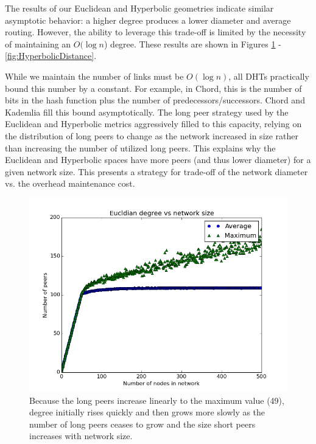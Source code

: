 The results of our Euclidean and Hyperbolic geometries indicate similar asymptotic behavior: a higher degree produces a lower diameter and average routing. 
However, the ability to leverage this trade-off is limited by the necessity of maintaining an $ O(\log n $) degree.
These results are shown in Figures \ref{fig:EucldianDegree} - \ref{fig:HyperbolicDistance}.

While we maintain the number of links must be $ O(\log n)$, all DHTs practically bound this number by a constant.  
For example, in Chord, this is the number of bits in the hash function plus the number of predecessors/successors.
Chord and Kademlia fill this bound asymptotically. 
The long peer strategy used by the Euclidean and Hyperbolic metrics aggressively filled to this capacity, relying on the distribution of long peers to change as the network increased in size rather than increasing the number of utilized long peers.
This explains why the Euclidean and Hyperbolic spaces have more peers (and thus lower diameter) for a given network size.
This presents a strategy for trade-off of the network diameter vs. the overhead maintenance cost.




\begin{figure}
\centering
\includegraphics[width=\linewidth]{figs/EucldianDegree}
\caption{Because the long peers increase linearly to the maximum value (49), degree initially rises quickly and then grows  more slowly as the number of long peers ceases to grow and the size short peers increases with network size. }
\label{fig:EucldianDegree}
\end{figure}

